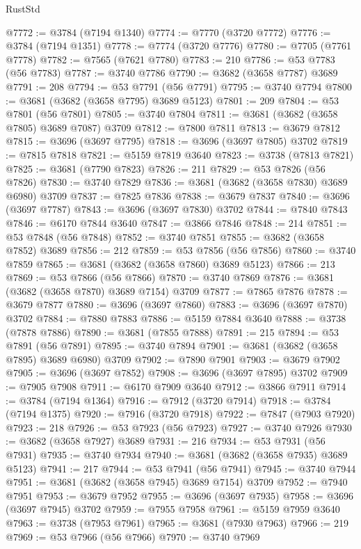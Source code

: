 \begin{lexlean}{RustStd}
\begin{coremodule}
@7772 := @3784 (@7194 @1340)
@7774 := @7770 (@3720 @7772)
@7776 := @3784 (@7194 @1351)
@7778 := @7774 (@3720 @7776)
@7780 := @7705 (@7761 @7778)
@7782 := @7565 (@7621 @7780)
@7783 := 210
@7786 := @53 @7783 (@56 @7783)
@7787 := @3740 @7786
@7790 := @3682 (@3658 @7787) @3689
@7791 := 208
@7794 := @53 @7791 (@56 @7791)
@7795 := @3740 @7794
@7800 := @3681 (@3682 (@3658 @7795) @3689 @5123)
@7801 := 209
@7804 := @53 @7801 (@56 @7801)
@7805 := @3740 @7804
@7811 := @3681 (@3682 (@3658 @7805) @3689 @7087) @3709
@7812 := @7800 @7811
@7813 := @3679 @7812
@7815 := @3696 (@3697 @7795)
@7818 := @3696 (@3697 @7805) @3702
@7819 := @7815 @7818
@7821 := @5159 @7819 @3640
@7823 := @3738 (@7813 @7821)
@7825 := @3681 (@7790 @7823)
@7826 := 211
@7829 := @53 @7826 (@56 @7826)
@7830 := @3740 @7829
@7836 := @3681 (@3682 (@3658 @7830) @3689 @6980) @3709
@7837 := @7825 @7836
@7838 := @3679 @7837
@7840 := @3696 (@3697 @7787)
@7843 := @3696 (@3697 @7830) @3702
@7844 := @7840 @7843
@7846 := @6170 @7844 @3640
@7847 := @3866 @7846
@7848 := 214
@7851 := @53 @7848 (@56 @7848)
@7852 := @3740 @7851
@7855 := @3682 (@3658 @7852) @3689
@7856 := 212
@7859 := @53 @7856 (@56 @7856)
@7860 := @3740 @7859
@7865 := @3681 (@3682 (@3658 @7860) @3689 @5123)
@7866 := 213
@7869 := @53 @7866 (@56 @7866)
@7870 := @3740 @7869
@7876 := @3681 (@3682 (@3658 @7870) @3689 @7154) @3709
@7877 := @7865 @7876
@7878 := @3679 @7877
@7880 := @3696 (@3697 @7860)
@7883 := @3696 (@3697 @7870) @3702
@7884 := @7880 @7883
@7886 := @5159 @7884 @3640
@7888 := @3738 (@7878 @7886)
@7890 := @3681 (@7855 @7888)
@7891 := 215
@7894 := @53 @7891 (@56 @7891)
@7895 := @3740 @7894
@7901 := @3681 (@3682 (@3658 @7895) @3689 @6980) @3709
@7902 := @7890 @7901
@7903 := @3679 @7902
@7905 := @3696 (@3697 @7852)
@7908 := @3696 (@3697 @7895) @3702
@7909 := @7905 @7908
@7911 := @6170 @7909 @3640
@7912 := @3866 @7911
@7914 := @3784 (@7194 @1364)
@7916 := @7912 (@3720 @7914)
@7918 := @3784 (@7194 @1375)
@7920 := @7916 (@3720 @7918)
@7922 := @7847 (@7903 @7920)
@7923 := 218
@7926 := @53 @7923 (@56 @7923)
@7927 := @3740 @7926
@7930 := @3682 (@3658 @7927) @3689
@7931 := 216
@7934 := @53 @7931 (@56 @7931)
@7935 := @3740 @7934
@7940 := @3681 (@3682 (@3658 @7935) @3689 @5123)
@7941 := 217
@7944 := @53 @7941 (@56 @7941)
@7945 := @3740 @7944
@7951 := @3681 (@3682 (@3658 @7945) @3689 @7154) @3709
@7952 := @7940 @7951
@7953 := @3679 @7952
@7955 := @3696 (@3697 @7935)
@7958 := @3696 (@3697 @7945) @3702
@7959 := @7955 @7958
@7961 := @5159 @7959 @3640
@7963 := @3738 (@7953 @7961)
@7965 := @3681 (@7930 @7963)
@7966 := 219
@7969 := @53 @7966 (@56 @7966)
@7970 := @3740 @7969

\end{coremodule}
\end{lexlean}
